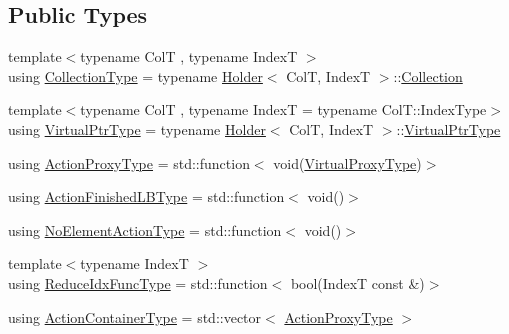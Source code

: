 \subsection*{Public Types}
\begin{DoxyCompactItemize}
\item 
{\footnotesize template$<$typename ColT , typename IndexT $>$ }\\using \hyperlink{structvt_1_1vrt_1_1collection_1_1_collection_manager_ad20a11229c9e9efe69135c207047bf85}{Collection\+Type} = typename \hyperlink{structvt_1_1vrt_1_1collection_1_1_holder}{Holder}$<$ ColT, IndexT $>$\+::\hyperlink{structvt_1_1vrt_1_1collection_1_1_collection}{Collection}
\item 
{\footnotesize template$<$typename ColT , typename IndexT  = typename Col\+T\+::\+Index\+Type$>$ }\\using \hyperlink{structvt_1_1vrt_1_1collection_1_1_collection_manager_a1da9015e52d6ecca955f57b59aab0b82}{Virtual\+Ptr\+Type} = typename \hyperlink{structvt_1_1vrt_1_1collection_1_1_holder}{Holder}$<$ ColT, IndexT $>$\+::\hyperlink{structvt_1_1vrt_1_1collection_1_1_collection_manager_a1da9015e52d6ecca955f57b59aab0b82}{Virtual\+Ptr\+Type}
\item 
using \hyperlink{structvt_1_1vrt_1_1collection_1_1_collection_manager_a98a759caf144277dcd341cdbd5538f59}{Action\+Proxy\+Type} = std\+::function$<$ void(\hyperlink{namespacevt_a1b417dd5d684f045bb58a0ede70045ac}{Virtual\+Proxy\+Type})$>$
\item 
using \hyperlink{structvt_1_1vrt_1_1collection_1_1_collection_manager_a2649daab7b437e1e2bdb5f2eefff29b6}{Action\+Finished\+L\+B\+Type} = std\+::function$<$ void()$>$
\item 
using \hyperlink{structvt_1_1vrt_1_1collection_1_1_collection_manager_a6b9b76aadc721cec45d3e0e02d849ff1}{No\+Element\+Action\+Type} = std\+::function$<$ void()$>$
\item 
{\footnotesize template$<$typename IndexT $>$ }\\using \hyperlink{structvt_1_1vrt_1_1collection_1_1_collection_manager_a47a3227ae0195c15187e8dc8762f66c4}{Reduce\+Idx\+Func\+Type} = std\+::function$<$ bool(IndexT const  \&)$>$
\item 
using \hyperlink{structvt_1_1vrt_1_1collection_1_1_collection_manager_a536805fb5c58b557b66e7d7febe87567}{Action\+Container\+Type} = std\+::vector$<$ \hyperlink{structvt_1_1vrt_1_1collection_1_1_collection_manager_a98a759caf144277dcd341cdbd5538f59}{Action\+Proxy\+Type} $>$
\item 

\end{DoxyCompactItemize}
